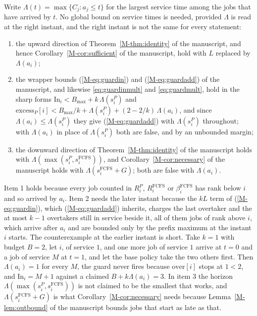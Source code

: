 \documentclass[mathematics,supfile,submit,moreauthors]{Definitions/mdpi}
\begin{document}
\begin{proposition}
\label{prop:supp_prefix_max}
Write $\Lambda(t) = \max\{C_j : a_j \le t\}$ for the largest service time among the
jobs that have arrived by $t$. No global bound on service times is needed, provided
$\Lambda$ is read at the right instant, and the right instant is not the same for
every statement:
\begin{enumerate}
\item the upward direction of Theorem~\ref*{M-thm:identity} of the manuscript, and hence Corollary~\ref*{M-cor:sufficient} of
the manuscript, hold with $L$ replaced by $\Lambda(a_i)$;
\item the wrapper bounds (\ref*{M-eq:guardin}) and (\ref*{M-eq:guardadd}) of the manuscript, and likewise
\eqref{eq:guardinmult} and \eqref{eq:guardmult},
hold in the sharp forms
$\mathrm{In}_i < B_{\max} + k\,\Lambda(s^P_i)$ and
$\mathrm{excess}_P[i] < B_{\max}/k + \Lambda(s^P_i) + (2-2/k)\,\Lambda(a_i)$, and
since $\Lambda(a_i) \le \Lambda(s^P_i)$ they give (\ref*{M-eq:guardadd}) with $\Lambda(s^P_i)$
throughout; with $\Lambda(a_i)$ in place of $\Lambda(s^P_i)$ both are false, and by
an unbounded margin;
\item the downward direction of Theorem~\ref*{M-thm:identity} of the manuscript holds with
$\Lambda(\max(s^P_i, s^{\mathrm{FCFS}}_i))$, and Corollary~\ref*{M-cor:necessary} of the manuscript holds
with $\Lambda(s^{\mathrm{FCFS}}_i + G)$; both are false with $\Lambda(a_i)$.
\end{enumerate}
\end{proposition}

Item 1 holds because every job counted in $R^P_i$, $R^{\mathrm{FCFS}}_i$ or
$\beta^{\mathrm{FCFS}}_i$ has rank below $i$ and so arrived by $a_i$. Item 2 needs the
later instant because the $kL$ term of (\ref*{M-eq:guardin}), which (\ref*{M-eq:guardadd}) inherits,
charges the last overtaker and the at most
$k-1$ overtakers still in service beside it, all of them jobs of rank above $i$, which
arrive after $a_i$ and are bounded only by the prefix maximum at the instant $i$
starts. The counterexample at the earlier instant is short. Take $k = 1$ with budget
$B = 2$, let $i$, of service $1$, and one more job of service $1$ arrive at $t = 0$ and a job of service $M$
at $t = 1$, and let the base policy take the two others first. Then
$\Lambda(a_i) = 1$ for every $M$, the guard never fires because $\mathrm{over}[i]$
stops at $1 < 2$, and $\mathrm{In}_i = M + 1$ against a claimed
$B + k\Lambda(a_i) = 3$. In item 3 the horizon
$\Lambda(\max(s^P_i, s^{\mathrm{FCFS}}_i))$ is not claimed to be the smallest that
works, and $\Lambda(s^{\mathrm{FCFS}}_i + G)$ is what Corollary~\ref*{M-cor:necessary} needs because
Lemma~\ref*{M-lem:outbound} of the manuscript bounds jobs that start as late as that.
\end{document}
